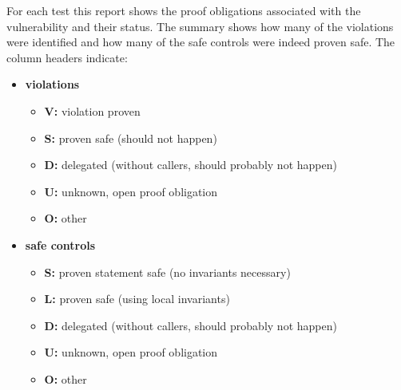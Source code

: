\documentclass[11pt]{article}
\begin{document}
For each test this report shows the proof obligations associated with the
vulnerability and their status. The summary shows how many of the violations
were identified and how many of the safe controls were indeed proven safe.
The column headers indicate:
\begin{itemize}
\item {\bf violations}
  \begin{itemize}
  \item {\bf V:} violation proven
  \item {\bf S:} proven safe (should not happen)
  \item {\bf D:} delegated (without callers, should probably not happen)
  \item {\bf U:} unknown, open proof obligation
  \item {\bf O:} other
  \end{itemize}
\item {\bf safe controls}
  \begin{itemize}
  \item {\bf S:} proven statement safe (no invariants necessary)
  \item {\bf L:} proven safe (using local invariants)
  \item {\bf D:} delegated (without callers, should probably not happen)
  \item {\bf U:} unknown, open proof obligation
  \item {\bf O:} other
  \end{itemize}
\end{itemize}




\end{document}
